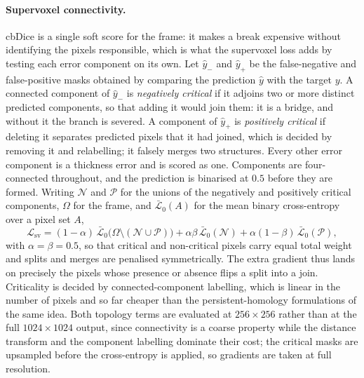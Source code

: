 \paragraph{Supervoxel connectivity.}
cbDice is a single soft score for the frame: it makes a break expensive
without identifying the pixels responsible, which is what the supervoxel
loss \cite{grim2025supervoxel} adds by testing each error component on its
own. Let $\hat{y}_-$ and $\hat{y}_+$ be the false-negative and
false-positive masks obtained by comparing the prediction $\hat{y}$ with the
target $y$. A connected component of $\hat{y}_-$ is \emph{negatively
critical} if it adjoins two or more distinct predicted components, so that
adding it would join them: it is a bridge, and without it the branch is
severed. A component of $\hat{y}_+$ is \emph{positively critical} if
deleting it separates predicted pixels that it had joined, which is decided
by removing it and relabelling; it falsely merges two structures. Every
other error component is a thickness error and is scored as one. Components
are four-connected throughout, and the prediction is binarised at $0.5$
before they are formed. Writing $\mathcal{N}$ and
$\mathcal{P}$ for the unions of the negatively and positively critical
components, $\Omega$ for the frame, and $\bar{\mathcal{L}}_0(A)$ for the
mean binary cross-entropy over a pixel set $A$,
\begin{equation}
\mathcal{L}_{\text{sv}}
 = (1-\alpha)\,\bar{\mathcal{L}}_0\big(\Omega \setminus (\mathcal{N} \cup \mathcal{P})\big)
 + \alpha\beta\,\bar{\mathcal{L}}_0(\mathcal{N})
 + \alpha(1-\beta)\,\bar{\mathcal{L}}_0(\mathcal{P}),
\label{eq:sv}
\end{equation}
with $\alpha = \beta = 0.5$, so that critical and non-critical pixels carry
equal total weight and splits and merges are penalised symmetrically. The
extra gradient thus lands on precisely the pixels whose presence or absence
flips a split into a join. Criticality is decided by connected-component
labelling, which is linear in the number of pixels and so far cheaper than
the persistent-homology formulations of the same idea. Both topology terms
are evaluated at $256\times256$ rather than at the full $1024\times1024$
output, since connectivity is a coarse property while the distance transform
and the component labelling dominate their cost; the critical masks are
upsampled before the cross-entropy is applied, so gradients are taken at
full resolution.

